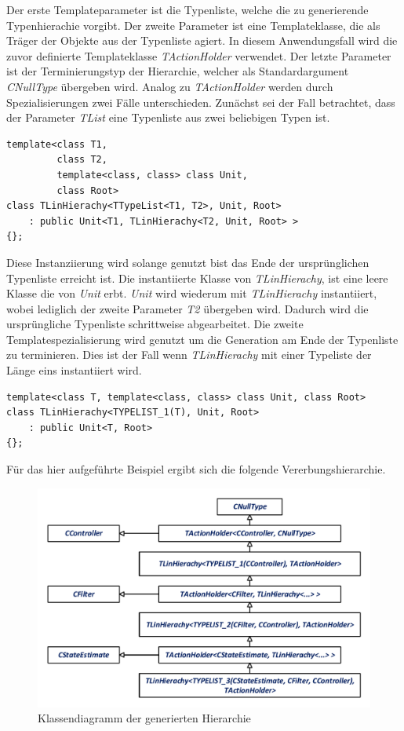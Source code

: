 Der erste Templateparameter ist die Typenliste, welche die zu generierende Typenhierachie vorgibt. Der zweite Parameter ist eine Templateklasse, die als Träger der Objekte aus der Typenliste agiert. In diesem Anwendungsfall wird die zuvor definierte Templateklasse \textit{TActionHolder} verwendet. Der letzte Parameter ist der Terminierungstyp der Hierarchie, welcher als Standardargument \textit{CNullType} übergeben wird. Analog zu \textit{TActionHolder} werden durch Spezialisierungen zwei Fälle unterschieden. Zunächst sei der Fall betrachtet, dass der Parameter \textit{TList} eine Typenliste aus zwei beliebigen Typen ist.
\begin{lstlisting}[caption={Erste Templatespezialisierung der linearen Hierarchie (\cite{ModernCpp}, S. 64)},captionpos=b]
template<class T1, 
         class T2, 
         template<class, class> class Unit, 
         class Root>
class TLinHierachy<TTypeList<T1, T2>, Unit, Root>
	: public Unit<T1, TLinHierachy<T2, Unit, Root> >
{};
\end{lstlisting}
Diese Instanziierung wird solange genutzt bist das Ende der ursprünglichen Typenliste erreicht ist. Die instantiierte Klasse von \textit{TLinHierachy}, ist eine leere Klasse die von \textit{Unit} erbt. \textit{Unit} wird wiederum mit \textit{TLinHierachy} instantiiert, wobei lediglich der zweite Parameter \textit{T2} übergeben wird. Dadurch wird die ursprüngliche Typenliste schrittweise abgearbeitet.
Die zweite Templatespezialisierung wird genutzt um die Generation am Ende der Typenliste zu terminieren. Dies ist der Fall wenn \textit{TLinHierachy} mit einer Typeliste der Länge eins instantiiert wird.
\begin{lstlisting}[caption={Zweite Templatespezialisierung der linearen Hierarchie (\cite{ModernCpp}, S. 64)},captionpos=b]
template<class T, template<class, class> class Unit, class Root>
class TLinHierachy<TYPELIST_1(T), Unit, Root>
	: public Unit<T, Root>
{};
\end{lstlisting}
Für das hier aufgeführte Beispiel ergibt sich die folgende Vererbungshierarchie.
\begin{figure}[!h]
\centering
\includegraphics[width=0.7\linewidth]{img/SW_1_Signalfluss_KD.pdf}
\caption{Klassendiagramm der generierten Hierarchie}
\end{figure}
